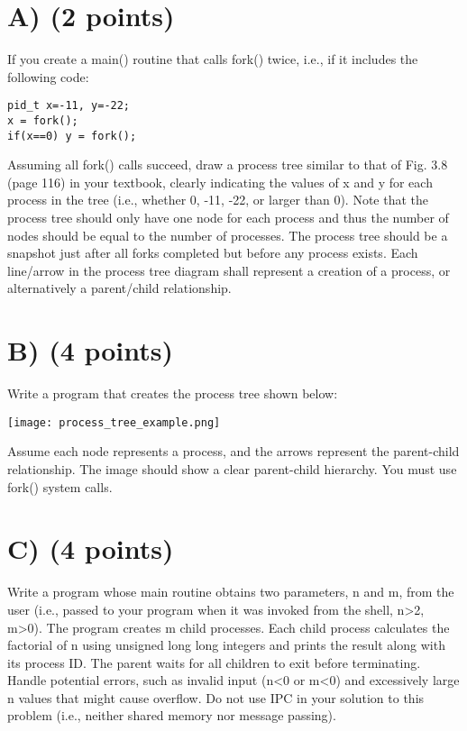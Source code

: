 \documentclass{article}
\begin{document}
\section*{A) (2 points)}
If you create a main() routine that calls fork() twice, i.e., if it includes the following code:
\begin{verbatim}
pid_t x=-11, y=-22;
x = fork();
if(x==0) y = fork();
\end{verbatim}
Assuming all fork() calls succeed, draw a process tree similar to that of Fig. 3.8 (page 116) in your textbook, clearly indicating the values of x and y for each process in the tree (i.e., whether 0, -11, -22, or larger than 0).
Note that the process tree should only have one node for each process and thus the number of nodes should be equal to the number of processes.
The process tree should be a snapshot just after all forks completed but before any process exists.
Each line/arrow in the process tree diagram shall represent a creation of a process, or alternatively a parent/child relationship.


\section*{B) (4 points)}
Write a program that creates the process tree shown below:

\begin{center}
\texttt{[image: process\_tree\_example.png]} %
\end{center}
Assume each node represents a process, and the arrows represent the parent-child relationship.  The image should show a clear parent-child hierarchy.  You must use fork() system calls.



\section*{C) (4 points)}
Write a program whose main routine obtains two parameters, n and m, from the user (i.e., passed to your program when it was invoked from the shell, n>2, m>0). The program creates m child processes. Each child process calculates the factorial of n using unsigned long long integers and prints the result along with its process ID. The parent waits for all children to exit before terminating.  Handle potential errors, such as invalid input (n<0 or m<0) and excessively large n values that might cause overflow. Do not use IPC in your solution to this problem (i.e., neither shared memory nor message passing).
\end{document}
